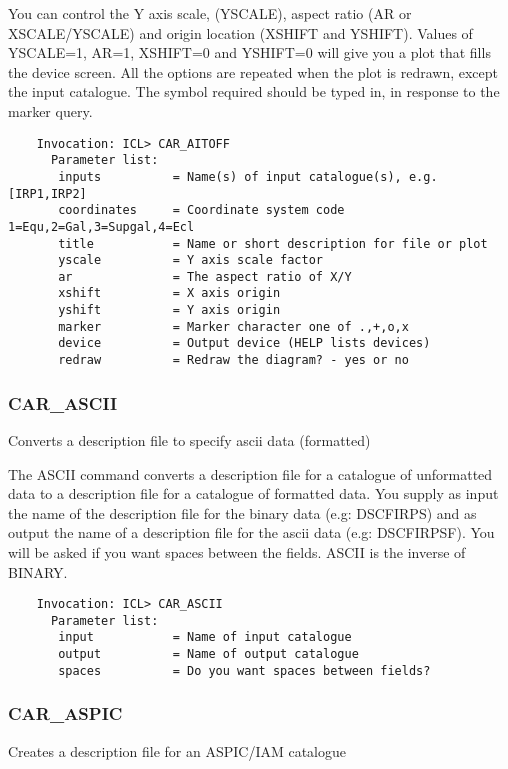 You can control the Y axis scale, (YSCALE), aspect ratio (AR or
XSCALE/YSCALE) and origin location (XSHIFT and YSHIFT). 
Values of YSCALE=1, AR=1, XSHIFT=0 and YSHIFT=0 will give you a plot
that fills the device screen.
All the options are repeated when the plot is redrawn, except the input
catalogue.
The symbol required should be typed in, in response to the marker query.
 
\begin{verbatim}
    Invocation: ICL> CAR_AITOFF
      Parameter list:
       inputs          = Name(s) of input catalogue(s), e.g. [IRP1,IRP2]
       coordinates     = Coordinate system code 1=Equ,2=Gal,3=Supgal,4=Ecl
       title           = Name or short description for file or plot
       yscale          = Y axis scale factor
       ar              = The aspect ratio of X/Y
       xshift          = X axis origin
       yshift          = Y axis origin
       marker          = Marker character one of .,+,o,x
       device          = Output device (HELP lists devices)
       redraw          = Redraw the diagram? - yes or no
\end{verbatim}

\subsubsection{CAR\_ASCII}

Converts a description file to specify ascii data (formatted)
 
The ASCII command converts a description file for a catalogue  of
unformatted  data  to a description file for a catalogue of formatted
data.
You supply as input the name of the description file for the
binary data (e.g: DSCFIRPS) and as output the name of a description
file for the ascii data (e.g: DSCFIRPSF). 
You will be asked if you want spaces between the fields.
ASCII is the inverse of BINARY.
 
\begin{verbatim}
    Invocation: ICL> CAR_ASCII
      Parameter list:
       input           = Name of input catalogue
       output          = Name of output catalogue
       spaces          = Do you want spaces between fields?
\end{verbatim}
 
\subsubsection{CAR\_ASPIC}

Creates a description file for an ASPIC/IAM catalogue

